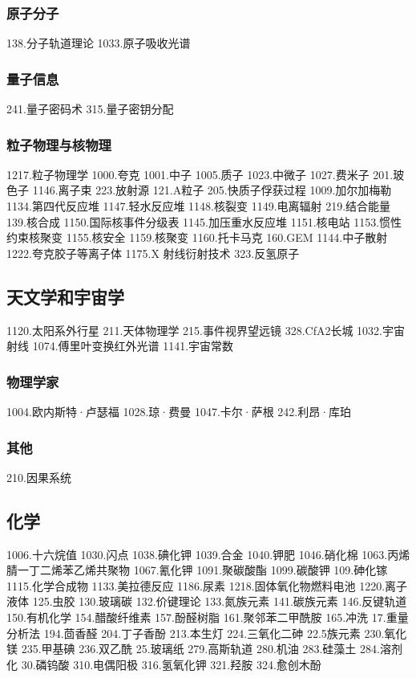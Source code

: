 \subsubsection{原子分子}
138.分子轨道理论
1033.原子吸收光谱
\subsubsection{量子信息}
241.量子密码术
315.量子密钥分配
\subsubsection{粒子物理与核物理}
1217.粒子物理学
1000.夸克
1001.中子
1005.质子
1023.中微子
1027.费米子
201.玻色子
1146.离子束
223.放射源
121.Α粒子
205.快质子俘获过程
1009.加尔加梅勒
1134.第四代反应堆
1147.轻水反应堆
1148.核裂变
1149.电离辐射
219.结合能量
139.核合成
1150.国际核事件分级表
1145.加压重水反应堆
1151.核电站
1153.惯性约束核聚变
1155.核安全
1159.核聚变
1160.托卡马克
160.GEM
1144.中子散射
1222.夸克胶子等离子体
1175.X 射线衍射技术
323.反氢原子


\subsection{天文学和宇宙学}
1120.太阳系外行星
211.天体物理学
215.事件视界望远镜
328.CfA2长城
1032.宇宙射线
1074.傅里叶变换红外光谱
1141.宇宙常数
\subsubsection{物理学家}
1004.欧内斯特·卢瑟福
1028.琼·费曼
1047.卡尔·萨根
242.利昂·库珀

\subsubsection{其他}
210.因果系统

\subsection{化学}
1006.十六烷值
1030.闪点
1038.碘化钾
1039.合金
1040.钾肥
1046.硝化棉
1063.丙烯腈一丁二烯苯乙烯共聚物
1067.氰化钾
1091.聚碳酸酯
1099.碳酸钾
109.砷化镓
1115.化学合成物
1133.美拉德反应
1186.尿素
1218.固体氧化物燃料电池
1220.离子液体
125.虫胶
130.玻璃碳
132.价键理论
133.氮族元素
141.碳族元素
146.反键轨道
150.有机化学
154.醋酸纤维素
157.酚醛树脂
161.聚邻苯二甲酰胺
165.冲洗
17.重量分析法
194.茴香醛
204.丁子香酚
213.本生灯
224.三氧化二砷
22.5族元素
230.氧化镁
235.甲基碘
236.双乙酰
25.玻璃纸
279.高斯轨道
280.机油
283.硅藻土
284.溶剂化
30.磷钨酸
310.电偶阳极
316.氢氧化钾
321.羟胺
324.愈创木酚

